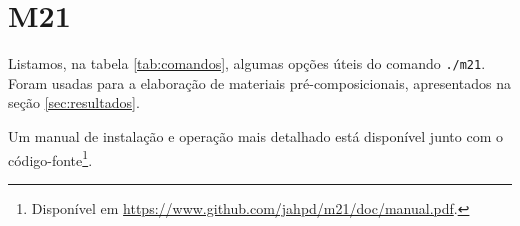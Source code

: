\section{M21}\label{sec:m21}

 Listamos, na tabela \ref{tab:comandos}, algumas opções úteis do comando \verb|./m21|. Foram usadas para a elaboração de materiais pré-composicionais, apresentados na seção \ref{sec:resultados}. 

Um manual de instalação e operação mais detalhado está disponível junto com o código-fonte\footnote{Disponível em \url{https://www.github.com/jahpd/m21/doc/manual.pdf}.}.



